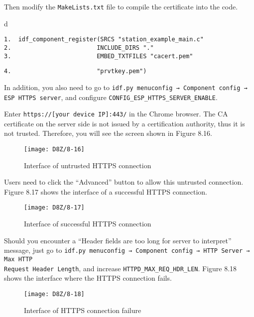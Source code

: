 \documentclass[a4paper,12pt]{book}
\begin{document}
Then modify the \verb|MakeLists.txt| file to compile the certificate into the code.

\begin{codebloc}
\begin{tabular}{d}
\vspace{2pt}
\begin{verbatim}
1.  idf_component_register(SRCS "station_example_main.c"
2.                        INCLUDE_DIRS "."
3.                        EMBED_TXTFILES "cacert.pem"
\end{verbatim}
\verb|4.                        "prvtkey.pem")|
\end{tabular}
\end{codebloc}

In addition, you also need to go to \verb|idf.py menuconfig → Component config → |\\ \verb|ESP HTTPS server|, and configure \verb|CONFIG_ESP_HTTPS_SERVER_ENABLE|.

Enter \verb|https://[your device IP]:443/| in the Chrome browser. The CA certificate on the server side is not issued by a certification authority, thus it is not trusted. Therefore, you will see the screen shown in Figure 8.16.

\begin{figure}[!h]
    \centering
    \texttt{[image: D8Z/8-16]}
    \caption{Interface of untrusted HTTPS connection}
\end{figure}

Users need to click the “Advanced” button to allow this untrusted connection. Figure 8.17 shows the interface of a successful HTTPS connection.

\begin{figure}[!h]
    \centering
    \texttt{[image: D8Z/8-17]}
    \caption{Interface of successful HTTPS connection}
\end{figure}

Should you encounter a “Header fields are too long for server to interpret” message, just go to \verb|idf.py menuconfig → Component config → HTTP Server → Max HTTP |\\ \verb|Request Header Length|, and increase \verb|HTTPD_MAX_REQ_HDR_LEN|. Figure 8.18 shows the interface where the HTTPS connection fails.

\begin{figure}[!h]
    \centering
    \texttt{[image: D8Z/8-18]}
    \caption{Interface of HTTPS connection failure}
\end{figure}
\end{document}
